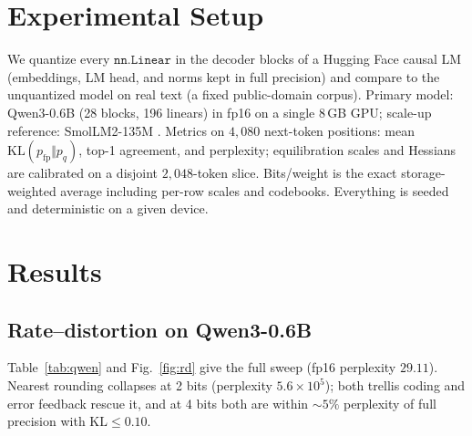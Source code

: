 \documentclass[11pt]{article}
\newcommand{\kl}{\mathrm{KL}}
\begin{document}
\section{Experimental Setup}
We quantize every $\texttt{nn.Linear}$ in the decoder blocks of a Hugging Face
causal LM (embeddings, LM head, and norms kept in full precision) and compare to
the unquantized model on real text (a fixed public-domain corpus). Primary model:
Qwen3-0.6B \citep{qwen3_2025} (28 blocks, 196 linears) in fp16 on a single
8\,GB GPU; scale-up reference: SmolLM2-135M \citep{allal2025smollm2}. Metrics on
$4{,}080$ next-token positions: mean $\kl(p_{\text{fp}}\Vert p_q)$, top-1
agreement, and perplexity; equilibration scales and Hessians are calibrated on a
disjoint $2{,}048$-token slice. Bits/weight is the exact storage-weighted average
including per-row scales and codebooks. Everything is seeded and deterministic on
a given device.

\section{Results}
\subsection{Rate--distortion on Qwen3-0.6B}
Table~\ref{tab:qwen} and Fig.~\ref{fig:rd} give the full sweep (fp16 perplexity
$29.11$). Nearest rounding collapses at 2 bits (perplexity $5.6\times10^5$);
both trellis coding and error feedback rescue it, and at 4 bits both are within
$\sim\!5\%$ perplexity of full precision with $\kl\le0.10$.
\end{document}
